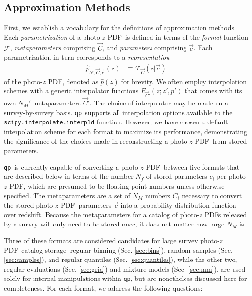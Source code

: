 \documentclass[\docopts]{\docclass}
\newcommand{\qp}{\texttt{qp}}
\newcommand{\pz}{photo-$z$ PDF}
\begin{document}
\subsection{Approximation Methods}
\label{sec:approx}



First, we establish a vocabulary for the definitions of approximation methods.  
Each \textit{parametrization} of a \pz\ is defined in terms of the 
\textit{format} function $\mathcal{F}$, \textit{metaparameters} comprising 
$\vec{C}$, and \textit{parameters} comprising $\vec{c}$.  Each parametrization 
in turn corresponds to a \textit{representation}
\begin{align}
  \label{eq:definition}
  \hat{p}_{\mathcal{F}, \vec{C}, \vec{c}}(z) &\equiv \mathcal{F}_{\vec{C}}(z | 
\vec{c})
\end{align}
of the \pz, denoted as $\hat{p}(z)$ for brevity.  We often employ interpolation 
schemes with a generic interpolator functions $F_{\vec{C}'}(z; z', p')$ that 
comes with its own $N_{M}'$ metaparameters $\vec{C}'$.  The choice of 
interpolator may be made on a survey-by-survey basis.  \qp\ supports all 
interpolation options available to the \texttt{scipy.interpolate.interp1d} 
function.  However, we have chosen a default interpolation scheme for each 
format to maximize its performance, demonstrating the significance of the 
choices made in reconstructing a \pz\ from stored parameters.

\qp\ is currently capable of converting a \pz\ between five formats that are 
described below in terms of the number $N_{f}$ of stored parameters $c_{i}$ per 
\pz, which are presumed to be floating point numbers unless otherwise 
specified.  The metaparameters are a set of $N_{M}$ numbers $C_{i}$ necessary 
to convert the stored \pz\ parameters $\vec{c}$ into a probability distribution 
function over redshift.  Because the metaparameters for a catalog of \pz s 
released by a survey will only need to be stored once, it does not matter how 
large $N_{M}$ is.

Three of these formats are considered candidates for large survey \pz\ catalog 
storage: regular binning (Sec. \ref{sec:bins}), random samples (Sec. 
\ref{sec:samples}), and regular quantiles (Sec. \ref{sec:quantiles}), while the 
other two, regular evaluations (Sec. \ref{sec:grid}) and mixture models (Sec. 
\ref{sec:mm}), are used solely for internal manipulations within \qp, but are 
nonetheless discussed here for completeness.  For each format, we address the 
following questions:
\end{document}
